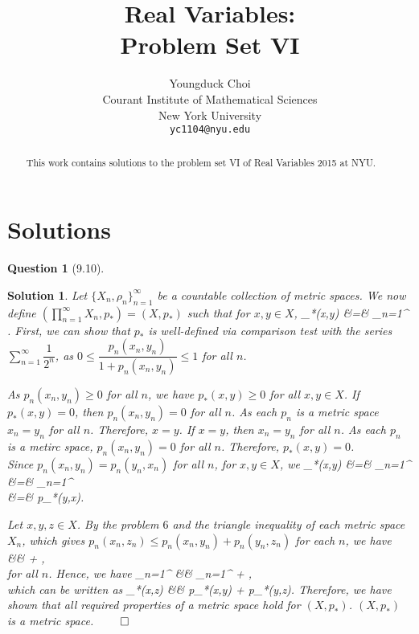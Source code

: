 \documentclass{article} %
\title{Real Variables: \\
Problem Set VI}
\author{
Youngduck Choi \\
Courant Institute of Mathematical Sciences \\
New York University \\
\texttt{yc1104@nyu.edu} \\
}
\def\eQb#1\eQe{\begin{eqnarray*}#1\end{eqnarray*}}
\theoremstyle{quest}
\newtheorem*{question}{Question}
\newtheorem*{solution}{Solution}
\begin{document}
\maketitle

\begin{abstract}
This work contains solutions to the problem set 
VI of Real Variables 2015 at NYU.
\end{abstract}

\section{Solutions}

\begin{question}[9.10]
\end{question}
\begin{solution}
Let $\{X_n, \rho_n \}_{n=1}^{\infty}$ be a countable collection
of metric spaces. We now define 
$( \prod_{n=1}^{\infty} X_n , p_*) = (X,p_*)$ such that for $x,y \in 
X$,
\eQb
p_*(x,y) &=& \sum_{n=1}^{\infty}  \cdot
{}. 
\eQe
First, we can show that $p_*$ is well-defined via
comparison test with the series $\sum_{n=1}^{\infty} \dfrac{1}{2^n}$,
as $0 \leq \dfrac{p_n(x_n,y_n)}{1+p_n(x_n,y_n)} \leq 1$ for all $n$. \\

\smallskip

As $p_n(x_n,y_n) \geq 0$ for all $n$, we have $p_*(x,y) \geq 0$ for all 
$x,y \in X$. If $p_*(x,y) = 0$, then $p_n(x_n,y_n) = 0$ for all $n$. 
As each $p_n$ is a metric space $x_n = y_n$ for all $n$. Therefore, 
$x = y$. If $x = y$, then $x_n = y_n$ for all $n$. As each $p_n$
is a metirc space, $p_n(x_n,
y_n) = 0$ for all $n$. Therefore, $p_*(x,y) = 0$. \\

\smallskip
Since $p_n(x_n,y_n) = p_n(y_n,x_n)$ for all $n$, for $x,y \in X$, we
\eQb
p_*(x,y) &=& \sum_{n=1}^{\infty}  \cdot
{} \\
&=& \sum_{n=1}^{\infty}  \cdot
{} \\
&=& p_*(y,x).
\eQe

Let $x,y,z \in X$. By the problem $6$ and the triangle inequality
of each metric space $X_n$, which gives $p_n(x_n,z_n) \leq
p_n(x_n,y_n) + p_n(y_n,z_n)$ for each $n$,  we have
\eQb
\dfrac{p_n(x_n,z_n)}{1 + p_n(x_n,z_n)} &\leq& 
 + 
, \\ 
\eQe 
for all $n$. Hence, we have
\eQb
\sum_{n=1}^{\infty}  &\leq& 
\sum_{n=1}^{\infty}  + 
, \\ 
\eQe
which can be written as
\eQb
p_*(x,z) &\leq& p_*(x,y) + p_*(y,z).
\eQe
Therefore, we have shown that all required properties of a metric space
hold for $(X,p_*)$. $(X,p_*)$ is a metric space. $\qed$

\end{solution}
\end{document}
